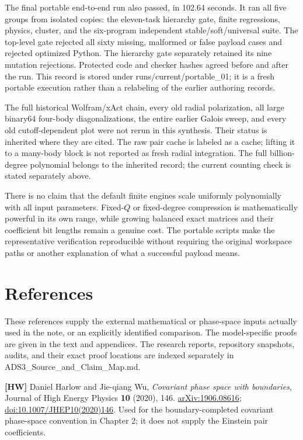 The final portable end-to-end run also passed, in 102.64 seconds. It ran all five groups from isolated copies: the eleven-task hierarchy gate, finite regressions, physics, cluster, and the six-program independent stable/soft/universal suite. The top-level gate rejected all sixty missing, malformed or false payload cases and rejected optimized Python. The hierarchy gate separately retained its nine mutation rejections. Protected code and checker hashes agreed before and after the run. This record is stored under runs/current/portable\_01; it is a fresh portable execution rather than a relabeling of the earlier authoring records.

The full historical Wolfram/xAct chain, every old radial polarization, all large binary64 four-body diagonalizations, the entire earlier Galois sweep, and every old cutoff-dependent plot were not rerun in this synthesis. Their status is inherited where they are cited. The raw pair cache is labeled as a cache; lifting it to a many-body block is not reported as fresh radial integration. The full billion-degree polynomial belongs to the inherited record; the current counting check is stated separately above.

There is no claim that the default finite engines scale uniformly polynomially with all input parameters. Fixed-\(Q\) or fixed-degree compression is mathematically powerful in its own range, while growing balanced exact matrices and their coefficient bit lengths remain a genuine cost. The portable scripts make the representative verification reproducible without requiring the original workspace paths or another explanation of what a successful payload means.

\clearpage
\hypertarget{references}{%
\section{References}\label{references}}

These references supply the external mathematical or phase-space inputs actually used in the note, or an explicitly identified comparison. The model-specific proofs are given in the text and appendices. The research reports, repository snapshots, audits, and their exact proof locations are indexed separately in ADS3\_Source\_and\_Claim\_Map.md.

\textbf{{[}HW{]}} Daniel Harlow and Jie-qiang Wu, \emph{Covariant phase space with boundaries}, Journal of High Energy Physics \textbf{10} (2020), 146. \href{https://arxiv.org/abs/1906.08616}{arXiv:1906.08616}; \href{https://doi.org/10.1007/JHEP10(2020)146}{doi:10.1007/JHEP10(2020)146}. Used for the boundary-completed covariant phase-space convention in Chapter 2; it does not supply the Einstein pair coefficients.

